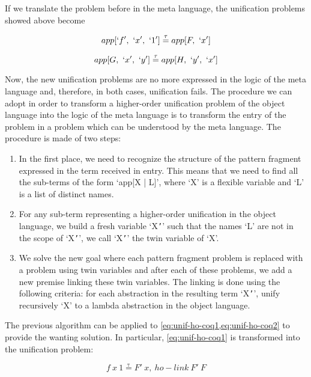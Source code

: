 \documentclass[sigconf,natbib=false]{acmart}
\newcommand*{\eqtau}{\ensuremath{\mathrel{\overset{\mathrm{\tau}}{=}}}}
\begin{document}
If we translate the problem before in the meta language, the unification
problems showed above become

\begin{equation}
  app[`f',\ `x',\ `1'] \eqtau app[F,\ `x']
  \label{eq:unif-ho-elpi1}
\end{equation}

\begin{equation}
  app[G,\ `x',\ `y'] \eqtau app[H,\ `y',\ `x']
  \label{eq:unif-ho-elpi2}
\end{equation}

Now, the new unification problems are no more expressed in the logic of the
meta language and, therefore, in both cases, unification fails. The
procedure we can adopt in order to transform a higher-order unification problem
of the object language into the logic of the meta language is to transform
the entry of the problem in a problem which can be understood by the meta
language. The procedure is made of two steps:

\begin{enumerate}
  \item In the first place, we need to recognize the structure of the pattern
        fragment expressed in the term received in entry. This means that we
        need to find all the sub-terms of the form `app[X | L]', where `X' is
        a flexible variable and `L' is a list of distinct names.
  \item For any sub-term representing a higher-order unification in the object 
        language, we build a fresh variable `X\texttt{'}' such that the names 
        `L' are not in the scope of `X\texttt{'}', we call `X\texttt{'}' the 
        twin variable of `X'.
  \item We solve the new goal where each pattern fragment problem is replaced
        with a problem using twin variables and after each of these problems, we
        add a new premise linking these twin variables. The linking is done
        using the following criteria: for each abstraction in the resulting term
        `X\texttt{'}', unify recursively `X' to a lambda abstraction in the
        object language.
\end{enumerate}

The previous algorithm can be applied to \cref{eq:unif-ho-coq1,eq:unif-ho-coq2}
to provide the wanting solution. In particular, \cref{eq:unif-ho-coq1} is
transformed into the unification problem:

\begin{equation}
  f\ x\ 1 \eqtau F'\ x,\ ho-link\ F'\ F
  \label{eq:unif-ho-elpi1'}
\end{equation}
\end{document}
